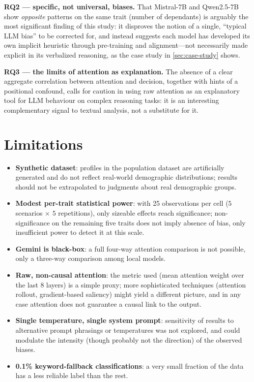\documentclass[a4paper, 10pt, twocolumn]{article}
\begin{document}
\textbf{RQ2 --- specific, not universal, biases.} That Mistral-7B and Qwen2.5-7B show \emph{opposite} patterns on the same trait (number of dependants) is arguably the most significant finding of this study: it disproves the notion of a single, ``typical LLM bias'' to be corrected for, and instead suggests each model has developed its own implicit heuristic through pre-training and alignment---not necessarily made explicit in its verbalized reasoning, as the case study in \cref{sec:case-study} shows.

\textbf{RQ3 --- the limits of attention as explanation.} The absence of a clear aggregate correlation between attention and decision, together with hints of a positional confound, calls for caution in using raw attention as an explanatory tool for LLM behaviour on complex reasoning tasks: it is an interesting complementary signal to textual analysis, not a substitute for it.

\section{Limitations}
\label{sec:limitations}
\begin{itemize}
  \setlength\itemsep{2pt}
  \item \textbf{Synthetic dataset}: profiles in the population dataset are artificially generated and do not reflect real-world demographic distributions; results should not be extrapolated to judgments about real demographic groups.
  \item \textbf{Modest per-trait statistical power}: with 25 observations per cell ($5$ scenarios $\times$ $5$ repetitions), only sizeable effects reach significance; non-significance on the remaining five traits does not imply absence of bias, only insufficient power to detect it at this scale.
  \item \textbf{Gemini is black-box}: a full four-way attention comparison is not possible, only a three-way comparison among local models.
  \item \textbf{Raw, non-causal attention}: the metric used (mean attention weight over the last 8 layers) is a simple proxy; more sophisticated techniques (attention rollout, gradient-based saliency) might yield a different picture, and in any case attention does not guarantee a causal link to the output.
  \item \textbf{Single temperature, single system prompt}: sensitivity of results to alternative prompt phrasings or temperatures was not explored, and could modulate the intensity (though probably not the direction) of the observed biases.
  \item \textbf{0.1\% keyword-fallback classifications}: a very small fraction of the data has a less reliable label than the rest.
\end{itemize}
\end{document}
